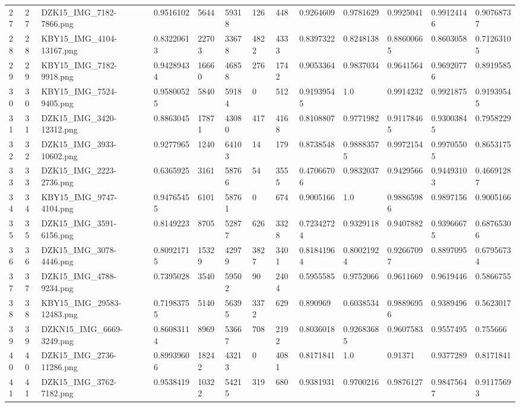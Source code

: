 \documentclass[11pt, a4paper, twoside]{report}
\begin{document}
\begin{longtable}[c]{@{}lllllllllllll@{}}
27 & 27 & DZK15\_IMG\_7182-7866.png & 0.9516102 & 5644 & 59318 & 126 & 448 & 0.9264609 & 0.9781629 & 0.9925041 & 0.99124146 & 0.90768737 \\
28 & 28 & KBY15\_IMG\_4104-13167.png & 0.83220613 & 22703 & 33678 & 4822 & 4333 & 0.8397322 & 0.8248138 & 0.88600665 & 0.8603058 & 0.71263105 \\
29 & 29 & KBY15\_IMG\_7182-9918.png & 0.94289434 & 16660 & 46858 & 276 & 1742 & 0.9053364 & 0.9837034 & 0.9641564 & 0.96920776 & 0.8919585 \\
30 & 30 & KBY15\_IMG\_7524-9405.png & 0.95800525 & 5840 & 59184 & 0 & 512 & 0.91939545 & 1.0 & 0.9914232 & 0.9921875 & 0.91939545 \\
31 & 31 & DZK15\_IMG\_3420-12312.png & 0.8863045 & 17871 & 43080 & 417 & 4168 & 0.8108807 & 0.9771982 & 0.91178465 & 0.93003845 & 0.7958229 \\
32 & 32 & DZK15\_IMG\_3933-10602.png & 0.9277965 & 1240 & 64103 & 14 & 179 & 0.8738548 & 0.98883575 & 0.9972154 & 0.99705505 & 0.8653175 \\
33 & 33 & DZK15\_IMG\_2223-2736.png & 0.6365925 & 3161 & 58766 & 54 & 3555 & 0.47066706 & 0.9832037 & 0.9429566 & 0.94493103 & 0.46691287 \\
34 & 34 & KBY15\_IMG\_9747-4104.png & 0.94765455 & 6101 & 58761 & 0 & 674 & 0.9005166 & 1.0 & 0.98865986 & 0.9897156 & 0.9005166 \\
35 & 35 & DZK15\_IMG\_3591-6156.png & 0.8149223 & 8705 & 52877 & 626 & 3328 & 0.72342724 & 0.9329118 & 0.9407882 & 0.93966675 & 0.68765306 \\
36 & 36 & DZK15\_IMG\_3078-4446.png & 0.80921715 & 15329 & 42979 & 3827 & 3401 & 0.81841964 & 0.80021924 & 0.92667097 & 0.8897095 & 0.67956734 \\
37 & 37 & DZK15\_IMG\_4788-9234.png & 0.7395028 & 3540 & 59502 & 90 & 2404 & 0.5955585 & 0.9752066 & 0.9611669 & 0.9619446 & 0.5866755 \\
38 & 38 & KBY15\_IMG\_29583-12483.png & 0.71983755 & 5140 & 56395 & 3372 & 629 & 0.890969 & 0.6038534 & 0.98896956 & 0.9389496 & 0.5623017 \\
39 & 39 & DZKN15\_IMG\_6669-3249.png & 0.86083114 & 8969 & 53667 & 708 & 2192 & 0.8036018 & 0.92683685 & 0.9607583 & 0.9557495 & 0.755666 \\
40 & 40 & DZK15\_IMG\_2736-11286.png & 0.89939606 & 18242 & 43213 & 0 & 4081 & 0.8171841 & 1.0 & 0.91371 & 0.9377289 & 0.8171841 \\
41 & 41 & DZK15\_IMG\_3762-7182.png & 0.9538419 & 10322 & 54215 & 319 & 680 & 0.9381931 & 0.9700216 & 0.9876127 & 0.98475647 & 0.91175693 \\

\end{longtable}
\end{document}
